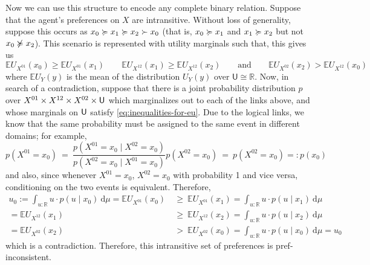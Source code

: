 \documentclass{article}
\begin{document}
	Now we can use this structure to encode any complete binary relation. Suppose that the agent's preferences on $X$ are intransitive. Without loss of generality, suppose this occurs as $x_0 \succcurlyeq x_1 \succcurlyeq x_2 \succ x_0$ (that is, $x_0 \succcurlyeq x_1$ and $x_1 \succcurlyeq x_2$ but not $x_0 \not\succcurlyeq x_2$). This scenario is represented with utility marginals such that, this gives us
	\begin{equation}\label{eq:inequalities-for-eu}
		\mathbb E U_{X^{01}} (x_0 ) \geq \mathbb E U_{X^{01}} (x_1 ) 
		\qquad
		\mathbb E U_{X^{12}} (x_1 ) \geq \mathbb E U_{X^{12}} (x_2 ) 
		\qquad\text{and}\qquad
		\mathbb E U_{X^{02}} (x_2 ) > \mathbb E U_{X^{12}} (x_0 ) 
	\end{equation}
	where $\mathbb E U_Y(y)$ is the mean of the distribution $U_Y(y)$ over $\mathsf U \cong \mathbb R$. Now, in search of a contradiction, suppose that there is a joint probability distribution $p$ over $X^{01}\times X^{12}\times X^{02}\times\sf U$ which marginalizes out to each of the links above, and whose marginals on $\sf U$ satisfy \eqref{eq:inequalities-for-eu}. Due to the logical links, we know that the same probability must be assigned to the same event in different domains; for example,
	\[ p(X^{01} = x_0)~=~\frac{p(X^{01} = x_0 \mid X^{02} = x_0)}{p(X^{02} = x_0 \mid X^{01} = x_0)} p(X^{02} = x_0)~=~ p(X^{02} = x_0) =: p(x_0)\]
	and also, since whenever $X^{01} = x_0$, $X^{02} = x_0$ with probability 1 and vice versa, conditioning on the two events is equivalent. Therefore,	
	\begin{align*}
		u_0 := \int_{u: \mathbb R} u\cdot p(u \mid x_0)~\mathrm d \mu = \mathbb E U_{X^{01}} (x_0 ) &~\geq~ \mathbb E U_{X^{01}} (x_1 ) =	\int_{u: \mathbb R} u\cdot p(u \mid x_1)~\mathrm d \mu \\ 
		=\mathbb E U_{X^{12}} (x_1 ) &~\geq~ \mathbb E U_{X^{12}} (x_2 ) = \int_{u: \mathbb R} u\cdot p(u \mid x_2)~\mathrm d \mu\\
		=\mathbb E U_{X^{02}} (x_2 ) &~>~ \mathbb E U_{X^{02}} (x_0 ) = 	\int_{u: \mathbb R} u\cdot p(u \mid x_0)~\mathrm d \mu
			= u_0
	\end{align*}
	which is a contradiction. Therefore, this intransitive set of preferences is pref-inconsistent.
	
\end{document}
